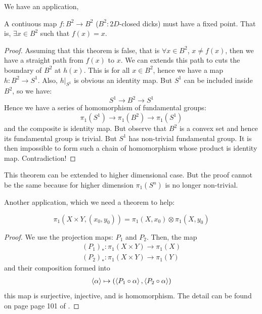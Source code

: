 We have an application,
\begin{thm}
    A contiuous map $f:B^2\to B^2$ ($B^2:2D$-closed dicks) must have a
fixed point. That is, $\exists x\in B^2$ such that $f(x)=x$.
\end{thm}
\begin{proof}
    Assuming that this theorem is false, that is $\forall x\in B^2$,
    $x\neq f(x)$, then we have a straight path from $f(x)$ to $x$. We can
    extends this path to cuts the boundary of $B^2$ at $h(x)$. This is
    for all $x\in B^2$, hence we have a map $h: B^2 \to S^1$. Also,
    $h|_{S^1}$ is obvious an identity map. But $S^1$ can be included
    inside $B^2$, so we have:
    \begin{equation}
        S^1 \to B^2 \to S^1
    \end{equation}
    Hence we have a series of homomorphism of fundamental groups:
    \begin{equation}
        \pi_1 (S^1) \to \pi_1 (B^2) \to \pi_1(S^1)
    \end{equation}
    and the composite is identity map. But observe that $B^2$ is a
    convex set and hence its fundamental group is trivial. But $S^1$
    has non-trivial fundamental group. It is then impossible to form
    such a chain of homomorphism whose product is identity map.
    Contradiction!
\end{proof}
\begin{remark}
    This theorem can be extended to higher dimensional case. But the
    proof cannot be the same because for higher dimension $\pi_1(S^n)$
    is no longer non-trivial.
\end{remark}

Another application, which we need a theorem to help:
\begin{thm}
    \begin{equation}
        \pi_1 (X\times Y, (x_0,y_0)) = \pi_1 (X,x_0) \otimes \pi_1
        (X,y_0)
    \end{equation}
\end{thm}
\begin{proof}
    We use the projection maps: $P_1$ and $P_2$.
    Then, the map
    \begin{align*}
        (P_1)_*: \pi_1 (X\times Y) \to \pi_1(X) \\
        (P_2)_*: \pi_1 (X\times Y) \to \pi_1(Y)
    \end{align*}
    and their composition formed into
    \begin{align*}
        \braket{\alpha}\mapsto
        (\braket{P_1\circ\alpha},\braket{P_2\circ\alpha})
    \end{align*}
    this map is surjective, injective, and is homomorphism.
    The detail can be found on page page 101 of \cite{book}.
\end{proof}

